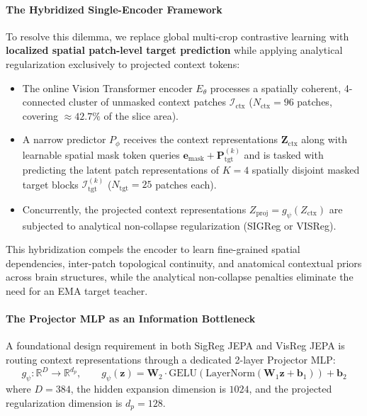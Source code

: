 \documentclass{article}
\begin{document}
\paragraph{The Hybridized Single-Encoder Framework}
To resolve this dilemma, we replace global multi-crop contrastive learning with \textbf{localized spatial patch-level target prediction} while applying analytical regularization exclusively to projected context tokens:
\begin{itemize}
    \item The online Vision Transformer encoder $E_\theta$ processes a spatially coherent, 4-connected cluster of unmasked context patches $\mathcal{I}_{\text{ctx}}$ ($N_{\text{ctx}} = 96$ patches, covering $\approx 42.7\%$ of the slice area).
    \item A narrow predictor $P_\phi$ receives the context representations $\mathbf{Z}_{\text{ctx}}$ along with learnable spatial mask token queries $\mathbf{e}_{\text{mask}} + \mathbf{P}_{\text{tgt}}^{(k)}$ and is tasked with predicting the latent patch representations of $K = 4$ spatially disjoint masked target blocks $\mathcal{I}_{\text{tgt}}^{(k)}$ ($N_{\text{tgt}} = 25$ patches each).
    \item Concurrently, the projected context representations $Z_{\text{proj}} = g_\psi(Z_{\text{ctx}})$ are subjected to analytical non-collapse regularization (SIGReg or VISReg).
\end{itemize}
This hybridization compels the encoder to learn fine-grained spatial dependencies, inter-patch topological continuity, and anatomical contextual priors across brain structures, while the analytical non-collapse penalties eliminate the need for an EMA target teacher.

\paragraph{The Projector MLP as an Information Bottleneck}
A foundational design requirement in both SigReg JEPA and VisReg JEPA is routing context representations through a dedicated 2-layer Projector MLP:
\begin{equation}
    g_\psi: \mathbb{R}^{D} \to \mathbb{R}^{d_p}, \qquad g_\psi(\mathbf{z}) = \mathbf{W}_2 \cdot \text{GELU}\left(\text{LayerNorm}\left(\mathbf{W}_1 \mathbf{z} + \mathbf{b}_1\right)\right) + \mathbf{b}_2
\end{equation}
where $D = 384$, the hidden expansion dimension is $1024$, and the projected regularization dimension is $d_p = 128$. 
\end{document}
